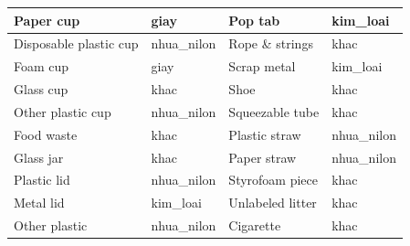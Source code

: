 \documentclass[../the.tex]{subfiles}
\begin{document}
\begin{table}[!ht]
\begin{tabular}{|l|l|l|l|}
        Paper cup & giay & Pop tab & kim\_loai \\ \hline
        Disposable plastic cup & nhua\_nilon & Rope \& strings & khac \\ \hline
        Foam cup & giay & Scrap metal & kim\_loai \\ \hline
        Glass cup & khac & Shoe & khac \\ \hline
        Other plastic cup & nhua\_nilon & Squeezable tube & khac \\ \hline
        Food waste & khac & Plastic straw & nhua\_nilon \\ \hline
        Glass jar & khac & Paper straw & nhua\_nilon \\ \hline
        Plastic lid & nhua\_nilon & Styrofoam piece & khac \\ \hline
        Metal lid & kim\_loai & Unlabeled litter & khac \\ \hline
        Other plastic & nhua\_nilon & Cigarette & khac \\ \hline
    \end{tabular}
	\label{tab:taco_map}
\end{table}
\end{document}
